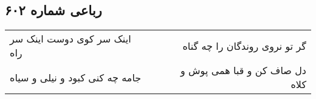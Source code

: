 \begin{center}
\section*{رباعی شماره ۶۰۲}
\label{sec:sh602}
\begin{longtable}{l p{0.5cm} r}
اینک سر کوی دوست اینک سر راه
&&
گر تو نروی روندگان را چه گناه
\\
جامه چه کنی کبود و نیلی و سیاه
&&
دل صاف کن و قبا همی پوش و کلاه
\\
\end{longtable}
\end{center}
